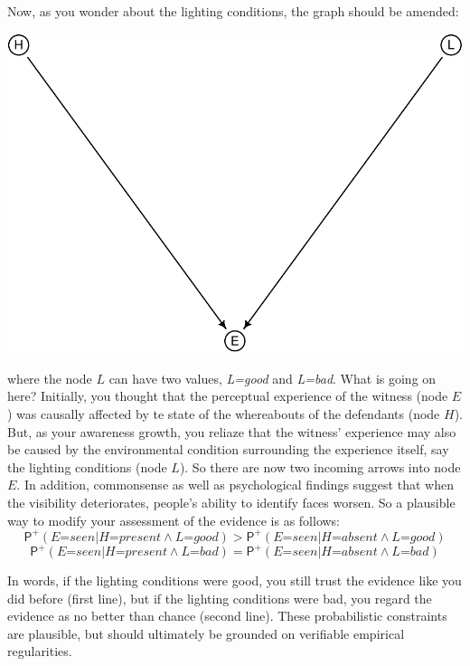 \documentclass[
  11pt,
  dvipsnames,enabledeprecatedfontcommands]{scrartcl}
\newcommand{\ppr}[2]{\ensuremath{\mathsf{P}^{#1}(#2)}}
\begin{document}
Now, as you wonder about the lighting conditions, the graph should be
amended:

\begin{center}\includegraphics[width=0.5\linewidth,height=0.3\textheight]{ReplyToSteeleStefansson5_files/figure-latex/lighting2DAG-1} \end{center}

\noindent where the node \(L\) can have two values, \textit{L=good} and
\textit{L=bad}. What is going on here? Initially, you thought that the
perceptual experience of the witness (node \(E\)) was causally affected
by te state of the whereabouts of the defendants (node \(H\)). But, as
your awareness growth, you reliaze that the witness' experience may also
be caused by the environmental condition surrounding the experience
itself, say the lighting conditions (node \(L\)). So there are now two
incoming arrows into node \(E\). In addition, commonsense as well as
psychological findings suggest that when the visibility deteriorates,
people's ability to identify faces worsen. So a plausible way to modify
your assessment of the evidence is as follows:
\[\ppr{+}{\textit{E=seen} \vert \textit{H=present} \wedge \textit{L=good}} > \ppr{+}{\textit{E=seen} \vert \textit{H=absent} \wedge \textit{L=good}}\]
\[\ppr{+}{\textit{E=seen} \vert \textit{H=present} \wedge \textit{L=bad}} = \ppr{+}{\textit{E=seen} \vert \textit{H=absent} \wedge \textit{L=bad}}\]

\noindent In words, if the lighting conditions were good, you still
trust the evidence like you did before (first line), but if the lighting
conditions were bad, you regard the evidence as no better than chance
(second line). These probabilistic constraints are plausible, but should
ultimately be grounded on verifiable empirical regularities.
\end{document}
